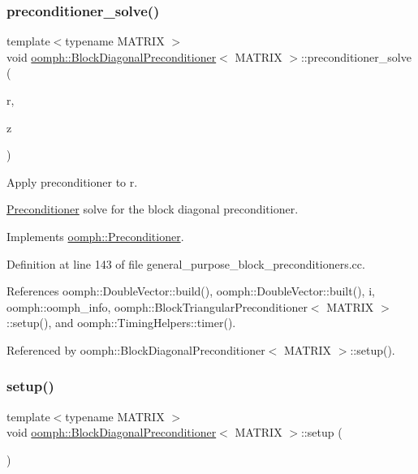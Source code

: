 \subsubsection{\texorpdfstring{preconditioner\+\_\+solve()}{preconditioner\_solve()}}
{\footnotesize\ttfamily template$<$typename M\+A\+T\+R\+IX $>$ \\
void \hyperlink{classoomph_1_1BlockDiagonalPreconditioner}{oomph\+::\+Block\+Diagonal\+Preconditioner}$<$ M\+A\+T\+R\+IX $>$\+::preconditioner\+\_\+solve (\begin{DoxyParamCaption}\item[{const \hyperlink{classoomph_1_1DoubleVector}{Double\+Vector} \&}]{r,  }\item[{\hyperlink{classoomph_1_1DoubleVector}{Double\+Vector} \&}]{z }\end{DoxyParamCaption})\hspace{0.3cm}{\ttfamily [virtual]}}



Apply preconditioner to r. 

\hyperlink{classoomph_1_1Preconditioner}{Preconditioner} solve for the block diagonal preconditioner. 

Implements \hyperlink{classoomph_1_1Preconditioner_ace1199369e4465cd2b9a34884bb64ec8}{oomph\+::\+Preconditioner}.



Definition at line 143 of file general\+\_\+purpose\+\_\+block\+\_\+preconditioners.\+cc.



References oomph\+::\+Double\+Vector\+::build(), oomph\+::\+Double\+Vector\+::built(), i, oomph\+::oomph\+\_\+info, oomph\+::\+Block\+Triangular\+Preconditioner$<$ M\+A\+T\+R\+I\+X $>$\+::setup(), and oomph\+::\+Timing\+Helpers\+::timer().



Referenced by oomph\+::\+Block\+Diagonal\+Preconditioner$<$ M\+A\+T\+R\+I\+X $>$\+::setup().

\mbox{\label{classoomph_1_1BlockDiagonalPreconditioner_a91bdd8e152045157f77c9cba513fe901}} 
\subsubsection{\texorpdfstring{setup()}{setup()}}
{\footnotesize\ttfamily template$<$typename M\+A\+T\+R\+IX $>$ \\
void \hyperlink{classoomph_1_1BlockDiagonalPreconditioner}{oomph\+::\+Block\+Diagonal\+Preconditioner}$<$ M\+A\+T\+R\+IX $>$\+::setup (\begin{DoxyParamCaption}{ }\end{DoxyParamCaption})\hspace{0.3cm}{\ttfamily [virtual]}}



